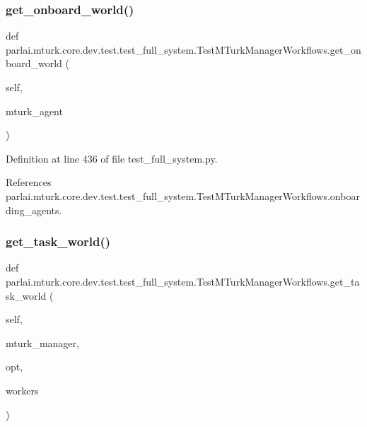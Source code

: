 \subsubsection{\texorpdfstring{get\+\_\+onboard\+\_\+world()}{get\_onboard\_world()}}
{\footnotesize\ttfamily def parlai.\+mturk.\+core.\+dev.\+test.\+test\+\_\+full\+\_\+system.\+Test\+M\+Turk\+Manager\+Workflows.\+get\+\_\+onboard\+\_\+world (\begin{DoxyParamCaption}\item[{}]{self,  }\item[{}]{mturk\+\_\+agent }\end{DoxyParamCaption})}



Definition at line 436 of file test\+\_\+full\+\_\+system.\+py.



References parlai.\+mturk.\+core.\+dev.\+test.\+test\+\_\+full\+\_\+system.\+Test\+M\+Turk\+Manager\+Workflows.\+onboarding\+\_\+agents.

\mbox{\label{classparlai_1_1mturk_1_1core_1_1dev_1_1test_1_1test__full__system_1_1TestMTurkManagerWorkflows_a9499834ef926100c17c84ec394a01086}} 
\subsubsection{\texorpdfstring{get\+\_\+task\+\_\+world()}{get\_task\_world()}}
{\footnotesize\ttfamily def parlai.\+mturk.\+core.\+dev.\+test.\+test\+\_\+full\+\_\+system.\+Test\+M\+Turk\+Manager\+Workflows.\+get\+\_\+task\+\_\+world (\begin{DoxyParamCaption}\item[{}]{self,  }\item[{}]{mturk\+\_\+manager,  }\item[{}]{opt,  }\item[{}]{workers }\end{DoxyParamCaption})}



